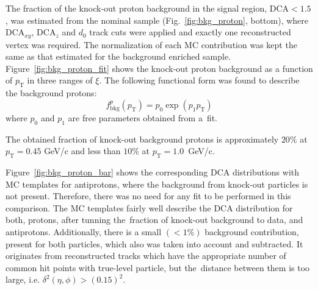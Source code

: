 The fraction of the knock-out proton background in the signal region, $\textrm{DCA}<1.5$, was estimated from the nominal sample (Fig.~\ref{fig:bkg_proton}, bottom), where $\textrm{DCA}_{xy}$, $\textrm{DCA}_z$ and $d_0$ track cuts were applied and exactly one reconstructed vertex was required. The normalization of each MC contribution was kept the same as that estimated for the background enriched sample. Figure~\ref{fig:bkg_proton_fit} shows the knock-out proton background as a function of $p_\textrm{T}$ in three ranges of $\xi$. The following functional form was found to describe the
background protons:
\begin{equation}
f_{\textrm{bkg}}^{p}\left(p_\textrm{T}\right) = p_0\exp\left(p_1p_\textrm{T}\right)
\label{eq:protonBkgParametrization}
\end{equation}
where  $p_0$ and $p_1$ are  free parameters obtained from a~fit. 

The obtained fraction of knock-out background protons is approximately $20\%$ at $p_\textrm{T} = 0.45$ GeV/c
 and less than $10\%$ at $p_\textrm{T} = 1.0$~GeV/c. 
 
 
 
 Figure~\ref{fig:bkg_proton_bar} shows the corresponding $\textrm{DCA}$ distributions with MC templates for antiprotons, where the background from knock-out particles is not present. Therefore, there was no need for any fit to be performed in this comparison. The MC templates  fairly well describe the $\textrm{DCA}$ distribution for both, protons, after tunning the~fraction of knock-out background to data, and antiprotons. Additionally, there is a small $\left(<1\%\right)$ background  contribution, present for both particles, which also was taken into account and subtracted. It originates from reconstructed tracks which have the appropriate number of common hit points with true-level particle, but the~distance between them is too large, i.e. $\delta^2\left(\eta,\phi\right)>\left(0.15\right)^2$.
 

